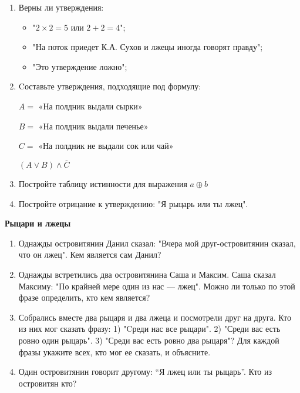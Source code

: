 \documentclass{article}
\begin{document}
\begin{enumerate}[label*=\protect\fbox{\arabic{enumi}}]
	
	\item Верны ли утверждения:
	\begin{itemize}
		\item "$2 \times 2 = 5$ или $2 + 2 = 4$";
		
		\item "На поток приедет К.А. Сухов и лжецы иногда говорят правду";
		
		\item "Это утверждение ложно";
	\end{itemize}
	
	\item Cоставьте утверждения, подходящие под формулу:
	
		$A =$ «На полдник выдали сырки»
		
		$B =$ «На полдник выдали печенье»
		
		$C =$ «На полдник не выдали сок или чай» 
		
		$(A\vee B)\wedge \overline{C}$
		
	
	\item Постройте таблицу истинности для выражения $a \oplus b$
	
	\item Постройте отрицание к утверждению: "Я рыцарь или ты лжец".
	
\end{enumerate}


\begin{center}
	\textbf{Рыцари и лжецы}
\end{center}

\begin{enumerate}[label*=\protect\fbox{\arabic{enumi}}]
	
	\item Однажды островитянин Данил сказал: "Вчера мой друг-островитянин сказал, что он лжец". Кем является сам Данил?
	
	\item Однажды встретились два островитянина Саша и Максим. Саша сказал Максиму: "По крайней мере один из нас — лжец". Можно ли только по этой фразе определить, кто кем является?
	
	\item Собрались вместе два рыцаря и два лжеца и посмотрели друг на друга. Кто из них мог сказать фразу: 1) "Cреди нас все рыцари". 2) "Среди вас есть ровно один рыцарь". 3) "Среди вас есть ровно два рыцаря"? Для каждой фразы укажите всех, кто мог ее сказать, и объясните.
	
	\item Один островитянин говорит другому: “Я лжец или ты рыцарь”. Кто из островитян кто?
	
\end{enumerate}
\end{document}
